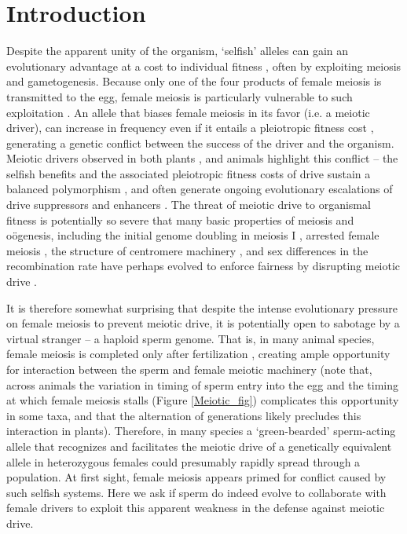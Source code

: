 \documentclass[12pt,letterpaper]{article}
\begin{document}
\section*{Introduction}
Despite the apparent unity of the organism, `selfish' alleles can
gain an evolutionary advantage at a cost to  individual fitness
\citep{Burt2006}, often by exploiting meiosis and gametogenesis.
Because only one of the four products of female meiosis is transmitted to the egg, female meiosis is particularly vulnerable to such exploitation \citep{Sandler1957,Pardo-ManuelDeVillena2001a}. 
An allele that biases female meiosis in its favor (i.e. a meiotic driver), can increase in frequency even if it entails a pleiotropic fitness cost \citep{Prout1973}, generating a genetic conflict between the success of the driver and the organism.
Meiotic drivers observed in both plants
\citep{Buckler1999,Fishman2005,Fishman2008}, and animals
\citep{Agulnik1990,Wu2005,Pardo-ManuelDeVillena2001c} highlight this
conflict -- the selfish benefits and the associated
pleiotropic fitness costs of drive sustain a balanced polymorphism
\citep{Prout1973}, 
and often generate ongoing evolutionary escalations of drive suppressors and enhancers \citep{Dawe1996,Fishman2008}. 
The threat of meiotic drive to organismal fitness is potentially so
severe that many basic properties of
meiosis and o\"{o}genesis, including the initial genome doubling in
meiosis I \citep{Haig1991}, arrested female meiosis
\citep{Mira1998}, the structure of centromere machinery \citep{Malik2002a,Malik2009}, and sex differences in the recombination rate \citep{Haig2010,Brandvain2012} 
have perhaps evolved to enforce fairness by disrupting meiotic drive \citep{Rice2013}. \newline 

It is therefore somewhat surprising that despite the intense evolutionary pressure on female meiosis to prevent meiotic drive, 
it is potentially open to sabotage by a virtual stranger -- a haploid sperm genome.
That is, in many animal species, female meiosis is completed only
after fertilization \citep{Masui_book}, creating ample opportunity for interaction between the sperm and
female meiotic machinery (note that, across animals the variation in timing of sperm entry into the egg and the timing at which female meiosis stalls (Figure \ref{Meiotic_fig}) complicates this opportunity in some taxa, and that the alternation of generations likely precludes this interaction in plants).
Therefore, in many species a `green-bearded' \citep{Gardner2010} sperm-acting allele that recognizes and facilitates the meiotic drive of a genetically equivalent allele in heterozygous females could presumably rapidly spread through a population. 
At first sight, female meiosis appears primed for conflict caused by such selfish systems. 
Here we ask if sperm do indeed evolve to collaborate with female drivers to exploit this 
	apparent weakness in the defense against meiotic drive. \newline 
\end{document}
